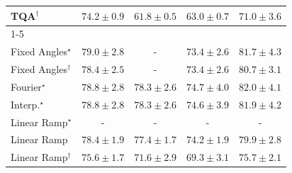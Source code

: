 \begin{tabular}{l|cccc|}
TQA$^\dagger$ & {\cellcolor[HTML]{389F55}} \color[HTML]{F1F1F1} $74.2\pm 0.9$ & {\cellcolor[HTML]{F7FCBA}} \color[HTML]{000000} $61.8\pm 0.5$ & {\cellcolor[HTML]{ECF7B1}} \color[HTML]{000000} $63.0\pm 0.7$ & {\cellcolor[HTML]{6FC174}} \color[HTML]{000000} $71.0\pm 3.6$ \\
\cline{1-5}
\multicolumn{5}{c}{\rule{0pt}{8pt}SV} \\
\midrule
Fixed Angles$^\star$ & {\cellcolor[HTML]{045B8E}} \color[HTML]{F1F1F1} $79.0\pm 2.8$ & {\cellcolor[HTML]{000000}} \color[HTML]{F1F1F1} {\cellcolor{white}} \color{black} - & {\cellcolor[HTML]{358FC0}} \color[HTML]{F1F1F1} $73.4\pm 2.6$ & {\cellcolor[HTML]{023B5D}} \color[HTML]{F1F1F1} $81.7\pm 4.3$ \\
Fixed Angles$^\dagger$ & {\cellcolor[HTML]{046096}} \color[HTML]{F1F1F1} $78.4\pm 2.5$ & {\cellcolor[HTML]{000000}} \color[HTML]{F1F1F1} {\cellcolor{white}} \color{black} - & {\cellcolor[HTML]{358FC0}} \color[HTML]{F1F1F1} $73.4\pm 2.6$ & {\cellcolor[HTML]{03476F}} \color[HTML]{F1F1F1} $80.7\pm 3.1$ \\
Fourier$^\star$ & {\cellcolor[HTML]{045C90}} \color[HTML]{F1F1F1} $78.8\pm 2.8$ & {\cellcolor[HTML]{046097}} \color[HTML]{F1F1F1} $78.3\pm 2.6$ & {\cellcolor[HTML]{2081B9}} \color[HTML]{F1F1F1} $74.7\pm 4.0$ & {\cellcolor[HTML]{023858}} \color[HTML]{F1F1F1} $82.0\pm 4.1$ \\
Interp.$^\star$ & {\cellcolor[HTML]{045C90}} \color[HTML]{F1F1F1} $78.8\pm 2.8$ & {\cellcolor[HTML]{046097}} \color[HTML]{F1F1F1} $78.3\pm 2.6$ & {\cellcolor[HTML]{2182B9}} \color[HTML]{F1F1F1} $74.6\pm 3.9$ & {\cellcolor[HTML]{02395A}} \color[HTML]{F1F1F1} $81.9\pm 4.2$ \\
Linear Ramp$^\star$ & {\cellcolor[HTML]{000000}} \color[HTML]{F1F1F1} {\cellcolor{white}} \color{black} - & {\cellcolor[HTML]{000000}} \color[HTML]{F1F1F1} {\cellcolor{white}} \color{black} - & {\cellcolor[HTML]{000000}} \color[HTML]{F1F1F1} {\cellcolor{white}} \color{black} - & {\cellcolor[HTML]{000000}} \color[HTML]{F1F1F1} {\cellcolor{white}} \color{black} - \\
Linear Ramp & {\cellcolor[HTML]{046096}} \color[HTML]{F1F1F1} $78.4\pm 1.9$ & {\cellcolor[HTML]{0567A2}} \color[HTML]{F1F1F1} $77.4\pm 1.7$ & {\cellcolor[HTML]{2786BB}} \color[HTML]{F1F1F1} $74.2\pm 1.9$ & {\cellcolor[HTML]{03517E}} \color[HTML]{F1F1F1} $79.9\pm 2.8$ \\
Linear Ramp$^\dagger$ & {\cellcolor[HTML]{1077B4}} \color[HTML]{F1F1F1} $75.6\pm 1.7$ & {\cellcolor[HTML]{5C9FC9}} \color[HTML]{F1F1F1} $71.6\pm 2.9$ & {\cellcolor[HTML]{89B1D4}} \color[HTML]{000000} $69.3\pm 3.1$ & {\cellcolor[HTML]{0F76B3}} \color[HTML]{F1F1F1} $75.7\pm 2.1$ \\

\end{tabular}
